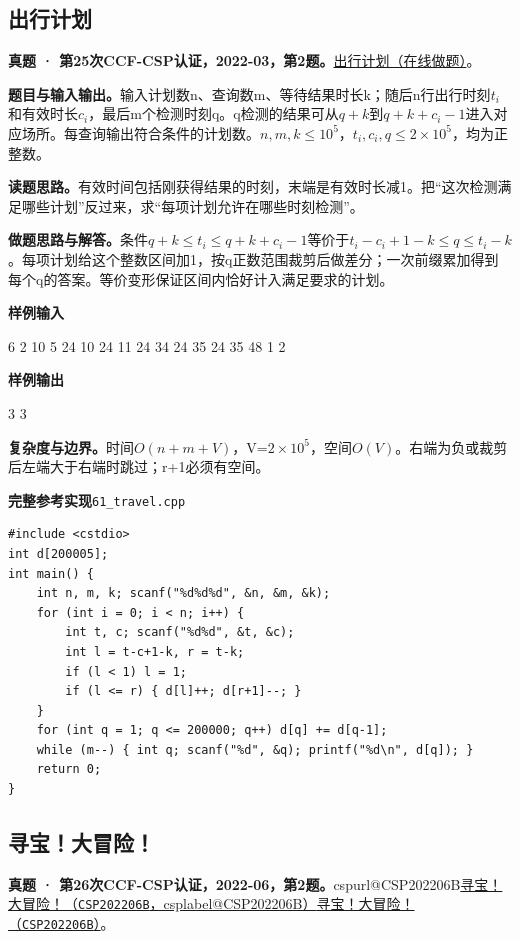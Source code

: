 \documentclass[UTF8,11pt,a4paper,fontset=none]{ctexart}
\makeatletter
\newcommand{\csp}[2]{\ifcsname cspurl@#1\endcsname\href{\csname cspurl@#1\endcsname}{#2（\texttt{#1}，\csname csplabel@#1\endcsname）}\else\href{https://oj.shumeng.tech/p/#1}{#2（\texttt{#1}）}\fi}
\makeatother
\begin{document}
\subsection{出行计划}
\textbf{真题 · 第25次CCF-CSP认证，2022-03，第2题。}\href{https://www.acwing.com/problem/content/4458/}{出行计划（在线做题）}。

\noindent\textbf{题目与输入输出。}输入计划数n、查询数m、等待结果时长k；随后n行出行时刻$t_i$和有效时长$c_i$，最后m个检测时刻q。q检测的结果可从$q+k$到$q+k+c_i-1$进入对应场所。每查询输出符合条件的计划数。$n,m,k\le10^5$，$t_i,c_i,q\le2\times10^5$，均为正整数。

\noindent\textbf{读题思路。}有效时间包括刚获得结果的时刻，末端是有效时长减1。把“这次检测满足哪些计划”反过来，求“每项计划允许在哪些时刻检测”。

\noindent\textbf{做题思路与解答。}条件$q+k\le t_i\le q+k+c_i-1$等价于$t_i-c_i+1-k\le q\le t_i-k$。每项计划给这个整数区间加1，按q正数范围裁剪后做差分；一次前缀累加得到每个q的答案。等价变形保证区间内恰好计入满足要求的计划。
\begin{tcolorbox}[samplebox,title={输入输出样例}]
\textbf{样例输入}
\begin{Sample}
6 2 10
5 24
10 24
11 24
34 24
35 24
35 48
1
2
\end{Sample}
\tcblower
\textbf{样例输出}
\begin{Sample}
3
3
\end{Sample}
\end{tcolorbox}

\noindent\textbf{复杂度与边界。}时间$O(n+m+V)$，V=$2\times10^5$，空间$O(V)$。右端为负或裁剪后左端大于右端时跳过；r+1必须有空间。
\par\noindent\begin{minipage}{\linewidth}
\textbf{完整参考实现}\quad\texttt{61\_travel.cpp}
\begin{lstlisting}
#include <cstdio>
int d[200005];
int main() {
    int n, m, k; scanf("%d%d%d", &n, &m, &k);
    for (int i = 0; i < n; i++) {
        int t, c; scanf("%d%d", &t, &c);
        int l = t-c+1-k, r = t-k;
        if (l < 1) l = 1;
        if (l <= r) { d[l]++; d[r+1]--; }
    }
    for (int q = 1; q <= 200000; q++) d[q] += d[q-1];
    while (m--) { int q; scanf("%d", &q); printf("%d\n", d[q]); }
    return 0;
}
\end{lstlisting}
\end{minipage}\par

\subsection{寻宝！大冒险！}
\textbf{真题 · 第26次CCF-CSP认证，2022-06，第2题。}\csp{CSP202206B}{寻宝！大冒险！}。
\end{document}
